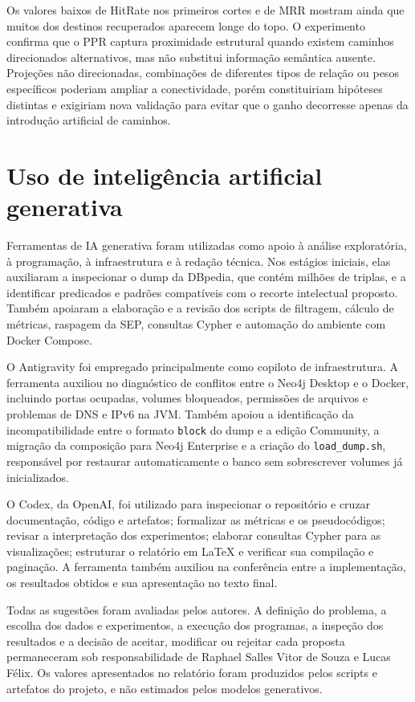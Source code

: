 \documentclass[10pt,a4paper]{article}
\begin{document}
Os valores baixos de HitRate nos primeiros cortes e de MRR mostram ainda que muitos dos destinos recuperados aparecem longe do topo. O experimento confirma que o PPR captura proximidade estrutural quando existem caminhos direcionados alternativos, mas não substitui informação semântica ausente. Projeções não direcionadas, combinações de diferentes tipos de relação ou pesos específicos poderiam ampliar a conectividade, porém constituiriam hipóteses distintas e exigiriam nova validação para evitar que o ganho decorresse apenas da introdução artificial de caminhos.

\section{Uso de inteligência artificial generativa}

Ferramentas de IA generativa foram utilizadas como apoio à análise exploratória, à programação, à infraestrutura e à redação técnica. Nos estágios iniciais, elas auxiliaram a inspecionar o dump da DBpedia, que contém milhões de triplas, e a identificar predicados e padrões compatíveis com o recorte intelectual proposto. Também apoiaram a elaboração e a revisão dos scripts de filtragem, cálculo de métricas, raspagem da SEP, consultas Cypher e automação do ambiente com Docker Compose.

O Antigravity foi empregado principalmente como copiloto de infraestrutura. A ferramenta auxiliou no diagnóstico de conflitos entre o Neo4j Desktop e o Docker, incluindo portas ocupadas, volumes bloqueados, permissões de arquivos e problemas de DNS e IPv6 na JVM. Também apoiou a identificação da incompatibilidade entre o formato \texttt{block} do dump e a edição Community, a migração da composição para Neo4j Enterprise e a criação do \texttt{load\_dump.sh}, responsável por restaurar automaticamente o banco sem sobrescrever volumes já inicializados.

O Codex, da OpenAI, foi utilizado para inspecionar o repositório e cruzar documentação, código e artefatos; formalizar as métricas e os pseudocódigos; revisar a interpretação dos experimentos; elaborar consultas Cypher para as visualizações; estruturar o relatório em LaTeX e verificar sua compilação e paginação. A ferramenta também auxiliou na conferência entre a implementação, os resultados obtidos e sua apresentação no texto final.

Todas as sugestões foram avaliadas pelos autores. A definição do problema, a escolha dos dados e experimentos, a execução dos programas, a inspeção dos resultados e a decisão de aceitar, modificar ou rejeitar cada proposta permaneceram sob responsabilidade de Raphael Salles Vitor de Souza e Lucas Félix. Os valores apresentados no relatório foram produzidos pelos scripts e artefatos do projeto, e não estimados pelos modelos generativos.
\end{document}

